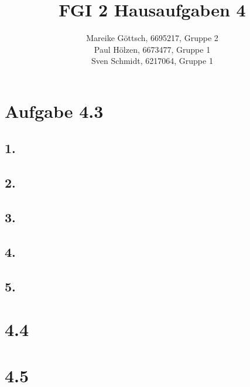 \documentclass[12pt, paper=a4]{article}
\author{Mareike Göttsch, 6695217, Gruppe 2\\Paul Hölzen, 6673477, Gruppe 1\\Sven Schmidt, 6217064, Gruppe 1}
\title{FGI 2 Hausaufgaben 4}
\begin{document}
\maketitle

\section*{Aufgabe 4.3}

\subsection*{1.}

\subsection*{2.}

\subsection*{3.}

\subsection*{4.}

\subsection*{5.}

\section*{4.4}

\section*{4.5}
\end{document}
